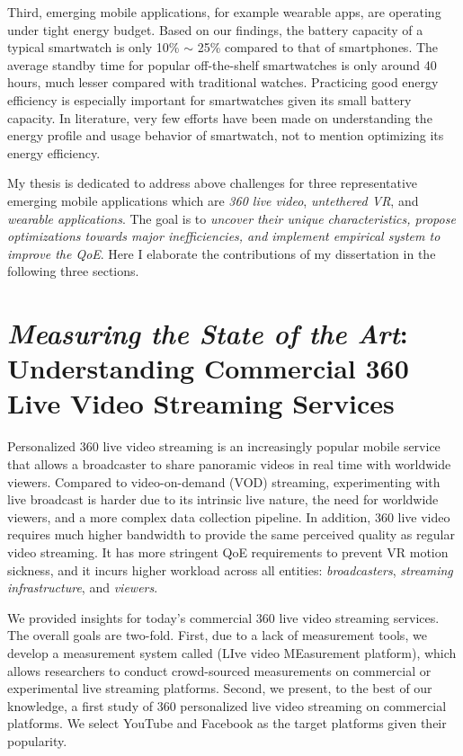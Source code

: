 Third, emerging mobile applications, for example wearable apps, are operating under tight energy budget. Based on our findings, the battery capacity of a typical smartwatch is only 10\% $\sim$ 25\% compared to that of smartphones. The average standby time for popular off-the-shelf smartwatches is only around 40 hours, much lesser compared with traditional watches. Practicing good energy efficiency is especially important for smartwatches given its small battery capacity. In literature, very few efforts have been made on understanding the energy profile and usage behavior of smartwatch, not to mention optimizing its energy efficiency.

My thesis is dedicated to address above challenges for three representative emerging mobile applications which are \emph{360\degree{} live video}, \emph{untethered VR}, and \emph{wearable applications}. The goal is to \emph{uncover their unique characteristics, propose optimizations towards major inefficiencies, and implement empirical system to improve the QoE}. Here I elaborate the contributions of my dissertation in the following three sections.


\section{\emph{Measuring the State of the Art}: Understanding Commercial 360\degree{} Live Video Streaming Services}


Personalized 360\degree{} live video streaming is an increasingly popular mobile service that allows a broadcaster to share panoramic videos in real time with worldwide viewers. Compared to video-on-demand (VOD) streaming, experimenting with live broadcast is harder due to its intrinsic live nature, the need for worldwide viewers, and a more complex data collection pipeline. In addition, 360\degree{} live video requires much higher bandwidth to provide the same perceived quality as regular
video streaming. It has more
stringent QoE requirements to prevent VR
motion sickness, and it incurs higher workload across all entities:
\emph{broadcasters}, \emph{streaming infrastructure}, and \emph{viewers}.

We provided insights for today’s commercial 360\degree{} live video streaming services. The overall goals are two-fold. First, due to
a lack of measurement tools, we develop a measurement system
called \lime (LIve video MEasurement platform), which allows researchers
to conduct crowd-sourced measurements on commercial
or experimental live streaming platforms. Second, we present, to
the best of our knowledge, a first study of 360\degree{} personalized live
video streaming on commercial platforms. We select YouTube and
Facebook as the target platforms given their popularity.


